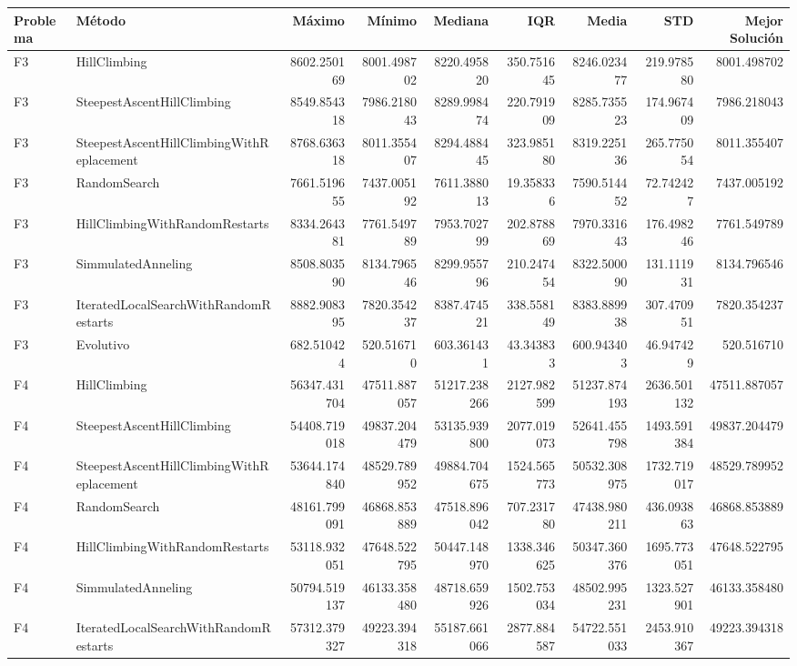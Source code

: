 \begin{tabular}{llrrrrrrr}
\toprule
Problema & Método & Máximo & Mínimo & Mediana & IQR & Media & STD & Mejor Solución \\
\midrule
F3 & HillClimbing & 8602.250169 & 8001.498702 & 8220.495820 & 350.751645 & 8246.023477 & 219.978580 & 8001.498702 \\
F3 & SteepestAscentHillClimbing & 8549.854318 & 7986.218043 & 8289.998474 & 220.791909 & 8285.735523 & 174.967409 & 7986.218043 \\
F3 & SteepestAscentHillClimbingWithReplacement & 8768.636318 & 8011.355407 & 8294.488445 & 323.985180 & 8319.225136 & 265.775054 & 8011.355407 \\
F3 & RandomSearch & 7661.519655 & 7437.005192 & 7611.388013 & 19.358336 & 7590.514452 & 72.742427 & 7437.005192 \\
F3 & HillClimbingWithRandomRestarts & 8334.264381 & 7761.549789 & 7953.702799 & 202.878869 & 7970.331643 & 176.498246 & 7761.549789 \\
F3 & SimmulatedAnneling & 8508.803590 & 8134.796546 & 8299.955796 & 210.247454 & 8322.500090 & 131.111931 & 8134.796546 \\
F3 & IteratedLocalSearchWithRandomRestarts & 8882.908395 & 7820.354237 & 8387.474521 & 338.558149 & 8383.889938 & 307.470951 & 7820.354237 \\
F3 & Evolutivo & 682.510424 & 520.516710 & 603.361431 & 43.343833 & 600.943403 & 46.947429 & 520.516710 \\
F4 & HillClimbing & 56347.431704 & 47511.887057 & 51217.238266 & 2127.982599 & 51237.874193 & 2636.501132 & 47511.887057 \\
F4 & SteepestAscentHillClimbing & 54408.719018 & 49837.204479 & 53135.939800 & 2077.019073 & 52641.455798 & 1493.591384 & 49837.204479 \\
F4 & SteepestAscentHillClimbingWithReplacement & 53644.174840 & 48529.789952 & 49884.704675 & 1524.565773 & 50532.308975 & 1732.719017 & 48529.789952 \\
F4 & RandomSearch & 48161.799091 & 46868.853889 & 47518.896042 & 707.231780 & 47438.980211 & 436.093863 & 46868.853889 \\
F4 & HillClimbingWithRandomRestarts & 53118.932051 & 47648.522795 & 50447.148970 & 1338.346625 & 50347.360376 & 1695.773051 & 47648.522795 \\
F4 & SimmulatedAnneling & 50794.519137 & 46133.358480 & 48718.659926 & 1502.753034 & 48502.995231 & 1323.527901 & 46133.358480 \\
F4 & IteratedLocalSearchWithRandomRestarts & 57312.379327 & 49223.394318 & 55187.661066 & 2877.884587 & 54722.551033 & 2453.910367 & 49223.394318 \\

\end{tabular}
